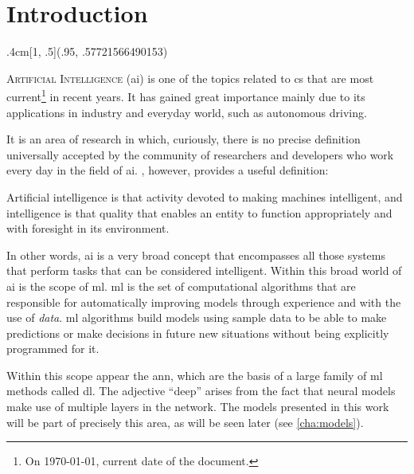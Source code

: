 

\chapter{Introduction}\label{cha:intro}

\begin{textblock*}{.4cm}[1, .5](.95\paperwidth, .57721566490153\paperheight)
  \noindent\resizebox{.4cm}{!}{\(\gamma\)}
\end{textblock*}



\lettrine{A}{rtificial Intelligence} (\acs{ai})
is one of the topics related to \gls{cs} that are most current\footnote{On
  \today, current date of the document.} in recent years. It has gained great
importance mainly due to its applications in industry and everyday world, such
as autonomous driving.

It is an area of research in which, curiously, there is no precise definition
universally accepted by the community of researchers and developers who work
every day in the field of \gls{ai}. ,
however, provides a useful definition:
\begin{quoteBox}
  Artificial intelligence is that activity devoted to making machines
  intelligent, and intelligence is that quality that enables an entity to
  function appropriately and with foresight in its environment.
  \tcblower{}
\end{quoteBox}

In other words, \gls{ai} is a very broad concept that encompasses all those
systems that perform tasks that can be considered intelligent. Within this
broad world of \gls{ai} is the scope of \gls{ml}. \Gls{ml} is the set of computational algorithms that are
responsible for automatically improving models through experience and with the
use of \emph{data}. \Gls{ml} algorithms build models using sample data to be
able to make predictions or make decisions in future new situations without
being explicitly programmed for it.

Within this scope appear the \gls{ann}, which are the basis of a large family
of \gls{ml} methods called \gls{dl}. The adjective
``deep'' arises from the fact that neural models make use of multiple layers in
the network. The models presented in this work will be part of precisely this
area, as will be seen later (see \vref{cha:models}).

